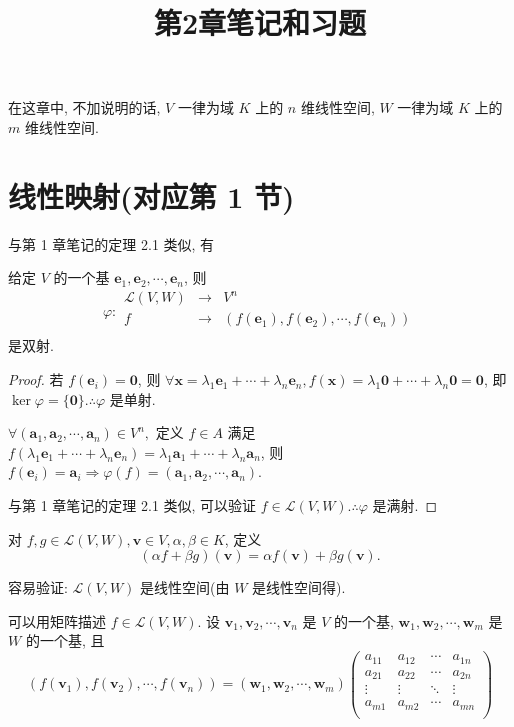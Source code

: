 \documentclass[color=black,device=normal,lang=cn,mode=geye]{elegantnote}
\title{第2章笔记和习题}
\begin{document}
\maketitle
在这章中, 不加说明的话, $V$ 一律为域 $K$ 上的 $n$ 维线性空间, $W$ 一律为域 $K$ 上的 $m$ 维线性空间.
\section{线性映射(对应第 1 节)}
与第 1 章笔记的定理 2.1 类似, 有
\begin{theorem}\label{t1.1}
    给定 $V$ 的一个基 $\boldsymbol{e}_1,\boldsymbol{e}_2,\cdots,\boldsymbol{e}_n$, 则
    \[\varphi:\begin{array}{rcl}
        \mathcal{L}(V,W) & \to & V^n \\
        f & \to & (f(\boldsymbol{e}_1),f(\boldsymbol{e}_2),\cdots,f(\boldsymbol{e}_n)) \\
    \end{array}\]
    是双射.
\end{theorem}
\begin{proof}
    若 $f(\boldsymbol{e}_i)=\boldsymbol{0}$, 则 $\forall\boldsymbol{x}=\lambda_1\boldsymbol{e}_1+\cdots+\lambda_n\boldsymbol{e}_n,f(\boldsymbol{x})=\lambda_1\boldsymbol{0}+\cdots+\lambda_n\boldsymbol{0}=\boldsymbol{0}$, 即 $\ker\varphi=\{\boldsymbol{0}\}.\therefore\varphi$ 是单射.

    $\forall(\boldsymbol{a}_1,\boldsymbol{a}_2,\cdots,\boldsymbol{a}_n)\in V^n,$ 定义 $f\in A$ 满足 $f(\lambda_1\boldsymbol{e}_1+\cdots+\lambda_n\boldsymbol{e}_n)=\lambda_1\boldsymbol{a}_1+\cdots+\lambda_n\boldsymbol{a}_n$, 则 $f(\boldsymbol{e}_i)=\boldsymbol{a}_i\Rightarrow\varphi(f)=(\boldsymbol{a}_1,\boldsymbol{a}_2,\cdots,\boldsymbol{a}_n)$.

    与第 1 章笔记的定理 2.1 类似, 可以验证 $f\in\mathcal{L}(V,W).\therefore\varphi$ 是满射.
\end{proof}

对 $f,g\in\mathcal{L}(V,W),\boldsymbol{v}\in V,\alpha,\beta\in K$, 定义
\[(\alpha f+\beta g)(\boldsymbol{v})=\alpha f(\boldsymbol{v})+\beta g(\boldsymbol{v}).\]

容易验证: $\mathcal{L}(V,W)$ 是线性空间(由 $W$ 是线性空间得).

可以用矩阵描述 $f\in\mathcal{L}(V,W)$. 设 $\boldsymbol{v}_1,\boldsymbol{v}_2,\cdots,\boldsymbol{v}_n$ 是 $V$ 的一个基, $\boldsymbol{w}_1,\boldsymbol{w}_2,\cdots,\boldsymbol{w}_m$ 是 $W$ 的一个基, 且
\begin{equation}\label{eq1.1}
    (f(\boldsymbol{v}_1),f(\boldsymbol{v}_2),\cdots,f(\boldsymbol{v}_n))=(\boldsymbol{w}_1,\boldsymbol{w}_2,\cdots,\boldsymbol{w}_m)\begin{pmatrix}
        a_{11} & a_{12} & \cdots & a_{1n} \\
        a_{21} & a_{22} & \cdots & a_{2n} \\
        \vdots & \vdots & \ddots & \vdots \\
        a_{m1} & a_{m2} & \cdots & a_{mn} \\
    \end{pmatrix}
\end{equation}
\end{document}
